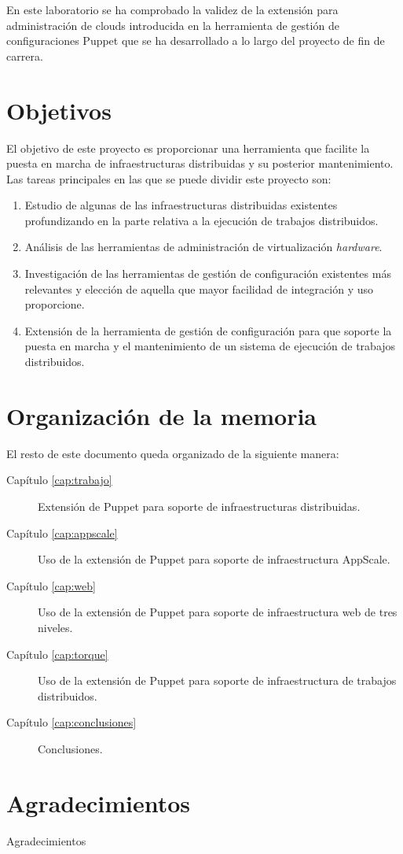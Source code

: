 En este laboratorio se ha comprobado la validez de la extensión para administración de clouds introducida en la herramienta de gestión de configuraciones Puppet que se ha desarrollado a lo largo del proyecto de fin de carrera.


\section{Objetivos}

El objetivo de este proyecto es proporcionar una herramienta que facilite la puesta en marcha de infraestructuras distribuidas y su posterior mantenimiento. Las tareas principales en las que se puede dividir este proyecto son:

\begin{enumerate}
\item Estudio de algunas de las infraestructuras distribuidas existentes profundizando en la parte relativa a la ejecución de trabajos distribuidos.
\item Análisis de las herramientas de administración de virtualización \emph{hardware}.
\item Investigación de las herramientas de gestión de configuración existentes más relevantes y elección de aquella que mayor facilidad de integración y uso proporcione.
\item Extensión de la herramienta de gestión de configuración para que soporte la puesta en marcha y el mantenimiento de un sistema de ejecución de trabajos distribuidos.
\end{enumerate}


\section{Organización de la memoria}

El resto de este documento queda organizado de la siguiente manera:
\begin{description}
\item[Capítulo \ref{cap:trabajo}] Extensión de Puppet para soporte de infraestructuras distribuidas.
\item[Capítulo \ref{cap:appscale}] Uso de la extensión de Puppet para soporte de infraestructura AppScale.
\item[Capítulo \ref{cap:web}] Uso de la extensión de Puppet para soporte de infraestructura web de tres niveles.
\item[Capítulo \ref{cap:torque}] Uso de la extensión de Puppet para soporte de infraestructura de trabajos distribuidos.
\item[Capítulo \ref{cap:conclusiones}] Conclusiones.
\end{description}


\section{Agradecimientos}

Agradecimientos
